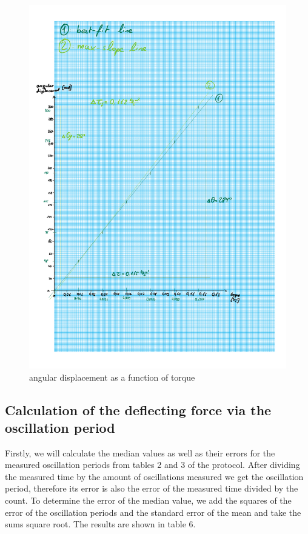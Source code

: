 \documentclass{article}
\begin{document}
\begin{figure} [p]
    \centering
    \includegraphics[width=\textwidth]{graphics/yuhuh.pdf}
    \caption{angular displacement as a function of torque}
\end{figure}

\newpage

\subsection{Calculation of the deflecting force via the oscillation period}

Firstly, we will calculate the median values as well as their errors for the measured oscillation periods from tables 2 and 3 of the protocol. After dividing the measured time by the amount of oscillations measured we get the oscillation period, therefore its error is also the error of the measured time divided by the count. To determine the error of the median value, we add the squares of the error of the oscillation periods and the standard error of the mean and take the sums square root. The results are shown in table 6.
\end{document}
